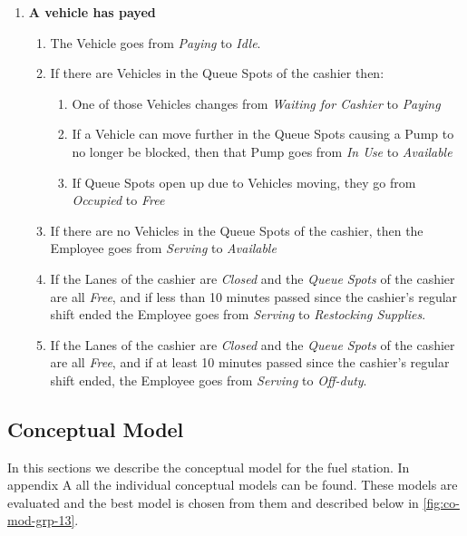 \begin{enumerate}
	\item \textbf{A vehicle has payed}
	\begin{enumerate}
		\item The Vehicle goes from \textit{Paying} to \textit{Idle}.
		\item If there are Vehicles in the Queue Spots of the cashier then:
		\begin{enumerate}
			\item One of those Vehicles changes from \textit{Waiting for Cashier} to \textit{Paying}
			\item If a Vehicle can move further in the Queue Spots causing a Pump to no longer be blocked, then that Pump goes from \textit{In Use} to \textit{Available}
			\item If Queue Spots open up due to Vehicles moving, they go from \textit{Occupied} to \textit{Free}
		\end{enumerate}
		\item If there are no Vehicles in the Queue Spots of the cashier, then the Employee goes from \textit{Serving} to \textit{Available}
		\item If the Lanes of the cashier are \textit{Closed} and the \textit{Queue Spots} of the cashier are all \textit{Free}, and if less than 10 minutes passed since the cashier's regular shift ended the Employee goes from \textit{Serving} to \textit{Restocking Supplies}.
		\item If the Lanes of the cashier are \textit{Closed} and the \textit{Queue Spots} of the cashier are all \textit{Free}, and if at least 10 minutes passed since the cashier's regular shift ended, the Employee goes from \textit{Serving} to \textit{Off-duty}.
	\end{enumerate}
\end{enumerate}

\subsection{Conceptual Model}
In this sections we describe the conceptual model for the fuel station. In appendix A all the individual conceptual models can be found. These models are evaluated and the best model is chosen from them and described below in \autoref{fig:co-mod-grp-13}.

